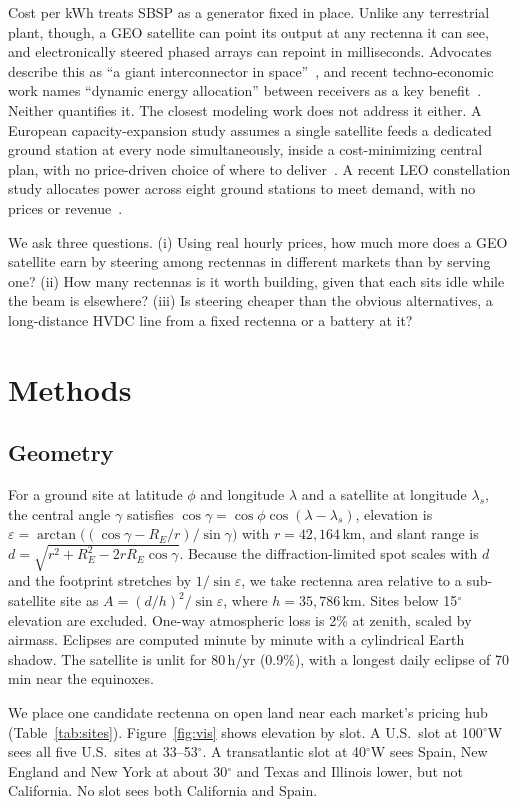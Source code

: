 \documentclass[11pt]{article}
\begin{document}
Cost per kWh treats SBSP as a generator fixed in place. Unlike any terrestrial plant, though, a GEO satellite can point
its output at any rectenna it can see, and electronically steered phased arrays can repoint in milliseconds.
Advocates describe this as ``a giant interconnector in space''~\cite{wef2025}, and recent techno-economic work names
``dynamic energy allocation'' between receivers as a key benefit~\cite{niebla2025}. Neither quantifies it.
The closest modeling work does not address it either. A European capacity-expansion study assumes a single satellite
feeds a dedicated ground station at every node simultaneously, inside a cost-minimizing central plan, with no price-driven
choice of where to deliver~\cite{che2025}. A recent LEO constellation study allocates power across eight ground
stations to meet demand, with no prices or revenue~\cite{leo2026}.

We ask three questions.
(i) Using real hourly prices, how much more does a GEO satellite earn by steering among rectennas in different markets
than by serving one?
(ii) How many rectennas is it worth building, given that each sits idle while the beam is elsewhere?
(iii) Is steering cheaper than the obvious alternatives, a long-distance HVDC line from a fixed rectenna or a battery at it?

\section{Methods}
\subsection{Geometry}
For a ground site at latitude $\phi$ and longitude $\lambda$ and a satellite at longitude $\lambda_s$, the central angle
$\gamma$ satisfies $\cos\gamma=\cos\phi\cos(\lambda-\lambda_s)$, elevation is
$\varepsilon=\arctan\!\big((\cos\gamma-R_E/r)/\sin\gamma\big)$ with $r=42{,}164$\,km, and slant range is
$d=\sqrt{r^2+R_E^2-2rR_E\cos\gamma}$. Because the diffraction-limited spot scales with $d$ and the footprint stretches by
$1/\sin\varepsilon$, we take rectenna area relative to a sub-satellite site as $A=(d/h)^2/\sin\varepsilon$, where
$h=35{,}786$\,km. Sites below 15$^\circ$ elevation are excluded. One-way atmospheric loss is 2\% at zenith, scaled
by airmass. Eclipses are computed minute by minute with a cylindrical Earth shadow. The satellite is unlit for
80\,h/yr (0.9\%), with a longest daily eclipse of 70\,min near the equinoxes.

We place one candidate rectenna on open land near each market's pricing hub (Table~\ref{tab:sites}).
Figure~\ref{fig:vis} shows elevation by slot. A U.S.\ slot at 100$^\circ$W sees all five U.S.\ sites at 33--53$^\circ$. A
transatlantic slot at 40$^\circ$W sees Spain, New England and New York at about 30$^\circ$ and Texas and Illinois
lower, but not California. No slot sees both California and Spain.
\end{document}
